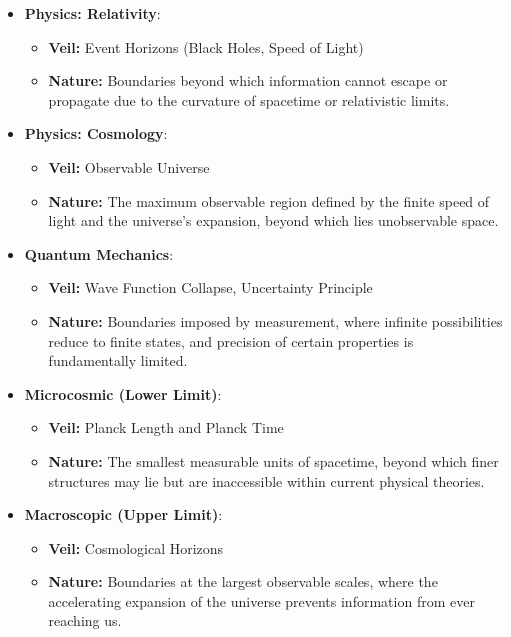 \documentclass[12pt]{article}
\begin{document}
\begin{itemize}
    \item \textbf{Physics: Relativity}:
    \begin{itemize}
        \item \textbf{Veil:} Event Horizons (Black Holes, Speed of Light)
        \item \textbf{Nature:} Boundaries beyond which information cannot escape or propagate due to the curvature of spacetime or relativistic limits.
    \end{itemize}

    \item \textbf{Physics: Cosmology}:
    \begin{itemize}
        \item \textbf{Veil:} Observable Universe
        \item \textbf{Nature:} The maximum observable region defined by the finite speed of light and the universe's expansion, beyond which lies unobservable space.
    \end{itemize}

    \item \textbf{Quantum Mechanics}:
    \begin{itemize}
        \item \textbf{Veil:} Wave Function Collapse, Uncertainty Principle
        \item \textbf{Nature:} Boundaries imposed by measurement, where infinite possibilities reduce to finite states, and precision of certain properties is fundamentally limited.
    \end{itemize}

    \item \textbf{Microcosmic (Lower Limit)}:
    \begin{itemize}
        \item \textbf{Veil:} Planck Length and Planck Time
        \item \textbf{Nature:} The smallest measurable units of spacetime, beyond which finer structures may lie but are inaccessible within current physical theories.
    \end{itemize}

    \item \textbf{Macroscopic (Upper Limit)}:
    \begin{itemize}
        \item \textbf{Veil:} Cosmological Horizons
        \item \textbf{Nature:} Boundaries at the largest observable scales, where the accelerating expansion of the universe prevents information from ever reaching us.
    \end{itemize}


\end{itemize}
\end{document}
